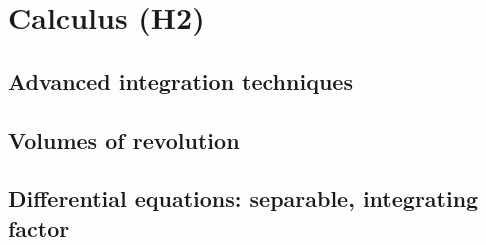 
\section{Calculus (H2)}

\subsection{Advanced integration techniques}


\subsection{Volumes of revolution}


\subsection{Differential equations: separable, integrating factor}


